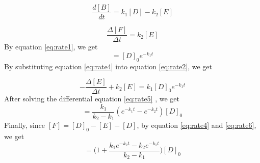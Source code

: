 \begin{equation}
\frac{d[B]}{dt} = k_1 [D] - k_2 [E]
\label{eq:rate2}
\end{equation}

\begin{equation}
\frac{\Delta [F]}{\Delta t} = k_2 [E]
\label{eq:rate3}
\end{equation}
By equation \ref{eq:rate1}, we get
\begin{equation}
[D] = [D]_0 e^{-k_1 t}
\label{eq:rate4}
\end{equation}
By substituting equation \ref{eq:rate4} into equation \ref{eq:rate2}, we get

\begin{equation}
- \frac{\Delta [E]}{\Delta t} + k_2 [E] = k_1 [D]_0 e^{-k_1 t}
\label{eq:rate5}
\end{equation}
After solving the differential equation \ref{eq:rate5} , we get
\begin{equation}
[E] = \frac{k_1}{k_2 - k_1} (e^{-k_1 t} - e^{-k_2 t}) [D]_0
\label{eq:rate6}
\end{equation}
Finally, since $[F]=[D]_0 -[E]-[D]$, by equation \ref{eq:rate4} and \ref{eq:rate6}, we get
\begin{equation}
[F] = \Bigg( 1+ \frac{k_1 e^{-k_2 t} - k_2 e^{-k_1 t}}{k_2 - k_1} \Bigg) [D]_0
\label{eq:rate7}
\end{equation}
